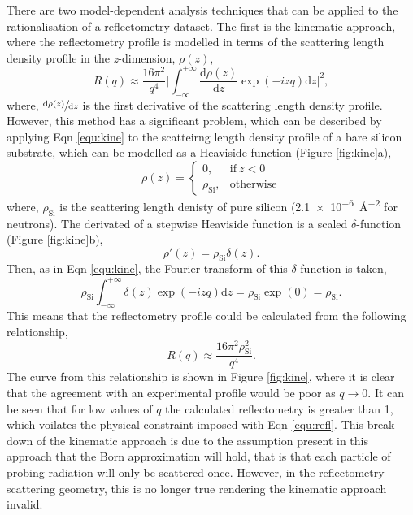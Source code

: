 There are two model-dependent analysis techniques that can be applied to the rationalisation of a reflectometry dataset. The first is the kinematic approach,\cite{Sivia2011} where the reflectometry profile is modelled in terms of the scattering length density profile in the \emph{z}-dimension, $\rho(z)$,
%
\begin{equation}
	R(q) \approx \frac{16\pi^2}{q^4}\bigg|\int_{-\infty}^{+\infty}\frac{\text{d}\rho(z)}{\text{d}z}\exp{(-izq)}\text{d}z\bigg|^2,
	\label{equ:kine}
\end{equation}
%
where, $\sfrac{\text{d}\rho(z)}{\text{d}z}$ is the first derivative of the scattering length density profile. However, this method has a significant problem, which can be described by applying Eqn \ref{equ:kine} to the scatteirng length density profile of a bare silicon substrate, which can be modelled as a Heaviside function (Figure \ref{fig:kine}a),
%
\begin{equation}
	\rho(z) =
  \begin{cases}
    0, & \text{if}\ z < 0 \\
    \rho_{\text{Si}}, & \text{otherwise}
  \end{cases}
\end{equation}
%
where, $\rho_{\text{Si}}$ is the scattering length denisty of pure silicon (\SI{2.1e-6}{\angstrom^{-2}} for neutrons). The derivated of a stepwise Heaviside function is a scaled $\delta$-function (Figure \ref{fig:kine}b),
%
\begin{equation}
	\rho'(z) = \rho_{\text{Si}}\delta(z).
\end{equation}
%
Then, as in Eqn \ref{equ:kine}, the Fourier transform of this $\delta$-function is taken,
%
\begin{equation}
	\rho_{\text{Si}}\int_{-\infty}^{+\infty}\delta(z)\exp{(-izq)}\text{d}z = \rho_{\text{Si}}\exp(0) = \rho_{\text{Si}}.
\end{equation}
%
This means that the reflectometry profile could be calculated from the following relationship,
%
\begin{equation}
	R(q)\approx \frac{16\pi^2\rho_{\text{Si}}^2}{q^4}.
\end{equation}
%
The curve from this relationship is shown in Figure \ref{fig:kine}, where it is clear that the agreement with an experimental profile would be poor as $q \rightarrow 0$. It can be seen that for low values of $q$ the calculated reflectometry is greater than 1, which voilates the physical constraint imposed with Eqn \ref{equ:refl}. This break down of the kinematic approach is due to the assumption present in this approach that the Born approximation will hold, that is that each particle of probing radiation will only be scattered once. However, in the reflectometry scattering geometry, this is no longer true rendering the kinematic approach invalid. 
